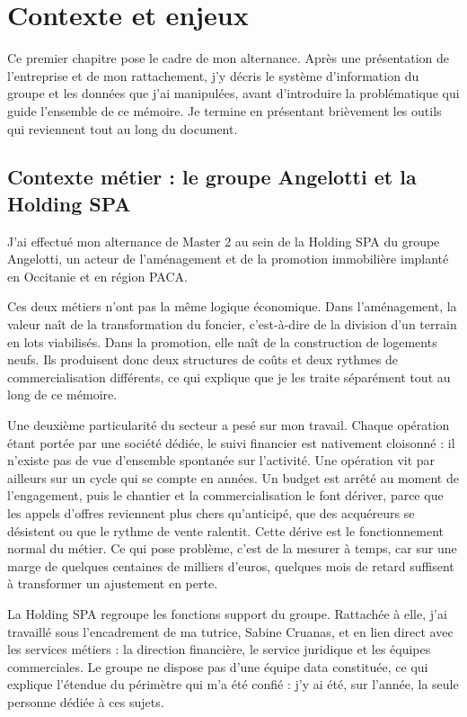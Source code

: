 
\chapter{Contexte et enjeux}
\minitoc
\newpage

Ce premier chapitre pose le cadre de mon alternance. Après une présentation de l'entreprise et
de mon rattachement, j'y décris le système d'information du groupe et les données que j'ai
manipulées, avant d'introduire la problématique qui guide l'ensemble de ce mémoire. Je termine
en présentant brièvement les outils qui reviennent tout au long du document.

\section{Contexte métier : le groupe Angelotti et la Holding SPA}

J'ai effectué mon alternance de Master 2 au sein de la Holding SPA du groupe Angelotti, un
acteur de l'aménagement et de la promotion immobilière implanté en Occitanie et en région PACA.

Ces deux métiers n'ont pas la même logique économique. Dans l'aménagement, la valeur naît de la
transformation du foncier, c'est-à-dire de la division d'un terrain en lots viabilisés. Dans la
promotion, elle naît de la construction de logements neufs. Ils produisent donc deux structures
de coûts et deux rythmes de commercialisation différents, ce qui explique que je les traite
séparément tout au long de ce mémoire.

Une deuxième particularité du secteur a pesé sur mon travail. Chaque opération étant portée par
une société dédiée, le suivi financier est nativement cloisonné : il n'existe pas de vue
d'ensemble spontanée sur l'activité. Une opération vit par ailleurs sur un cycle qui se compte
en années. Un budget est arrêté au moment de l'engagement, puis le chantier et la
commercialisation le font dériver, parce que les appels d'offres reviennent plus chers
qu'anticipé, que des acquéreurs se désistent ou que le rythme de vente ralentit. Cette dérive
est le fonctionnement normal du métier. Ce qui pose problème, c'est de la mesurer à temps, car
sur une marge de quelques centaines de milliers d'euros, quelques mois de retard suffisent à
transformer un ajustement en perte.

La Holding SPA regroupe les fonctions support du groupe. Rattachée à elle, j'ai travaillé sous
l'encadrement de ma tutrice, Sabine Cruanas, et en lien direct avec les services métiers : la
direction financière, le service juridique et les équipes commerciales. Le groupe ne dispose
pas d'une équipe data constituée, ce qui explique l'étendue du périmètre qui m'a été confié :
j'y ai été, sur l'année, la seule personne dédiée à ces sujets.

